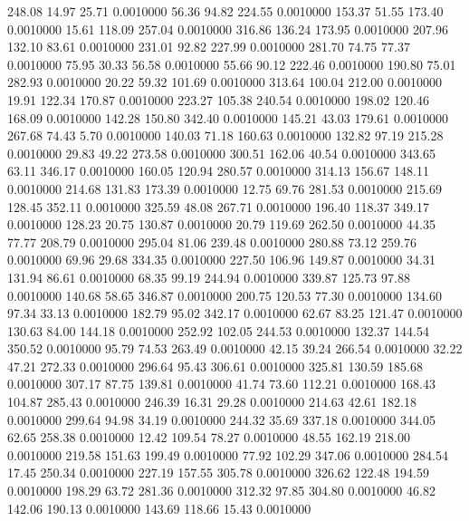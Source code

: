  248.08   14.97   25.71   0.0010000
  56.36   94.82  224.55   0.0010000
 153.37   51.55  173.40   0.0010000
  15.61  118.09  257.04   0.0010000
 316.86  136.24  173.95   0.0010000
 207.96  132.10   83.61   0.0010000
 231.01   92.82  227.99   0.0010000
 281.70   74.75   77.37   0.0010000
  75.95   30.33   56.58   0.0010000
  55.66   90.12  222.46   0.0010000
 190.80   75.01  282.93   0.0010000
  20.22   59.32  101.69   0.0010000
 313.64  100.04  212.00   0.0010000
  19.91  122.34  170.87   0.0010000
 223.27  105.38  240.54   0.0010000
 198.02  120.46  168.09   0.0010000
 142.28  150.80  342.40   0.0010000
 145.21   43.03  179.61   0.0010000
 267.68   74.43    5.70   0.0010000
 140.03   71.18  160.63   0.0010000
 132.82   97.19  215.28   0.0010000
  29.83   49.22  273.58   0.0010000
 300.51  162.06   40.54   0.0010000
 343.65   63.11  346.17   0.0010000
 160.05  120.94  280.57   0.0010000
 314.13  156.67  148.11   0.0010000
 214.68  131.83  173.39   0.0010000
  12.75   69.76  281.53   0.0010000
 215.69  128.45  352.11   0.0010000
 325.59   48.08  267.71   0.0010000
 196.40  118.37  349.17   0.0010000
 128.23   20.75  130.87   0.0010000
  20.79  119.69  262.50   0.0010000
  44.35   77.77  208.79   0.0010000
 295.04   81.06  239.48   0.0010000
 280.88   73.12  259.76   0.0010000
  69.96   29.68  334.35   0.0010000
 227.50  106.96  149.87   0.0010000
  34.31  131.94   86.61   0.0010000
  68.35   99.19  244.94   0.0010000
 339.87  125.73   97.88   0.0010000
 140.68   58.65  346.87   0.0010000
 200.75  120.53   77.30   0.0010000
 134.60   97.34   33.13   0.0010000
 182.79   95.02  342.17   0.0010000
  62.67   83.25  121.47   0.0010000
 130.63   84.00  144.18   0.0010000
 252.92  102.05  244.53   0.0010000
 132.37  144.54  350.52   0.0010000
  95.79   74.53  263.49   0.0010000
  42.15   39.24  266.54   0.0010000
  32.22   47.21  272.33   0.0010000
 296.64   95.43  306.61   0.0010000
 325.81  130.59  185.68   0.0010000
 307.17   87.75  139.81   0.0010000
  41.74   73.60  112.21   0.0010000
 168.43  104.87  285.43   0.0010000
 246.39   16.31   29.28   0.0010000
 214.63   42.61  182.18   0.0010000
 299.64   94.98   34.19   0.0010000
 244.32   35.69  337.18   0.0010000
 344.05   62.65  258.38   0.0010000
  12.42  109.54   78.27   0.0010000
  48.55  162.19  218.00   0.0010000
 219.58  151.63  199.49   0.0010000
  77.92  102.29  347.06   0.0010000
 284.54   17.45  250.34   0.0010000
 227.19  157.55  305.78   0.0010000
 326.62  122.48  194.59   0.0010000
 198.29   63.72  281.36   0.0010000
 312.32   97.85  304.80   0.0010000
  46.82  142.06  190.13   0.0010000
 143.69  118.66   15.43   0.0010000
